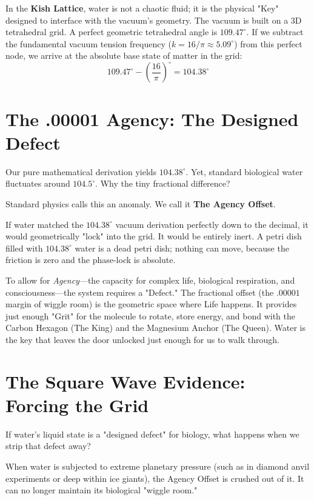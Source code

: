 \documentclass[11pt, letterpaper, openany]{book}
\begin{document}
In the \textbf{Kish Lattice}, water is not a chaotic fluid; it is the physical "Key" designed to interface with the vacuum's geometry.
The vacuum is built on a 3D tetrahedral grid. A perfect geometric tetrahedral angle is \textbf{$109.47^\circ$}.
If we subtract the fundamental vacuum tension frequency ($k = 16/\pi \approx 5.09^\circ$) from this perfect node, we arrive at the absolute base state of matter in the grid:
\begin{equation}
    109.47^\circ - \left(\frac{16}{\pi}\right)^\circ = \mathbf{104.38^\circ}
\end{equation}



\section{The .00001 Agency: The Designed Defect}
Our pure mathematical derivation yields $104.38^\circ$. Yet, standard biological water fluctuates around $104.5^\circ$. Why the tiny fractional difference? 

Standard physics calls this an anomaly. We call it \textbf{The Agency Offset}.

If water matched the $104.38^\circ$ vacuum derivation perfectly down to the decimal, it would geometrically "lock" into the grid. It would be entirely inert. A petri dish filled with $104.38^\circ$ water is a dead petri dish; nothing can move, because the friction is zero and the phase-lock is absolute.

To allow for \textit{Agency}—the capacity for complex life, biological respiration, and consciousness—the system requires a "Defect." The fractional offset (the $.00001$ margin of wiggle room) is the geometric space where Life happens. It provides just enough "Grit" for the molecule to rotate, store energy, and bond with the Carbon Hexagon (The King) and the Magnesium Anchor (The Queen). Water is the key that leaves the door unlocked just enough for us to walk through.

\section{The Square Wave Evidence: Forcing the Grid}
If water's liquid state is a "designed defect" for biology, what happens when we strip that defect away? 

When water is subjected to extreme planetary pressure (such as in diamond anvil experiments or deep within ice giants), the Agency Offset is crushed out of it. It can no longer maintain its biological "wiggle room."
\end{document}
